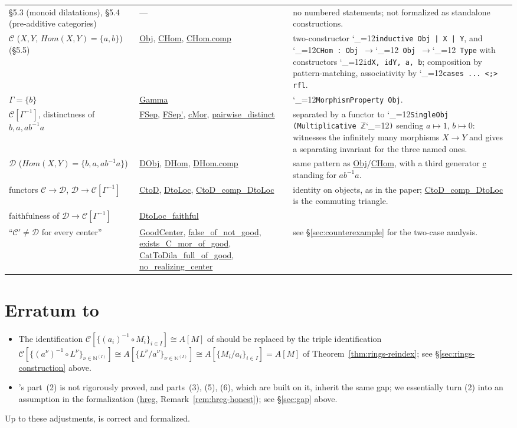 \documentclass[11pt]{amsart}
\newcommand{\lc}[1]{\url{#1}}
\newcommand{\lcode}{\begingroup\catcode`\_=12\relax\lcodeInner}
\newcommand{\lcodeInner}[1]{\texttt{#1}\endgroup}
\theoremstyle{plain}
\theoremstyle{definition}
\theoremstyle{remark}
\newcommand{\calC}{\mathcal C}
\newcommand{\calD}{\mathcal D}
\begin{document}
\begin{longtable}{@{}p{2.55cm}p{4.1cm}p{4.75cm}@{}}
\S5.3 (monoid dilatations), \S5.4 (pre-additive categories) & --- & no numbered statements; not formalized as standalone constructions. \\
$\calC$ ($X,Y$, $Hom(X,Y)=\{a,b\}$) (\S5.5) & \lc{Obj}, \lc{CHom}, \lc{CHom.comp} & two-constructor \lcode{inductive Obj | X | Y}, and \lcode{CHom : Obj }\ensuremath{\to}\lcode{ Obj }\ensuremath{\to}\lcode{ Type} with constructors \lcode{idX, idY, a, b}; composition by pattern-matching, associativity by \lcode{cases ... <;> rfl}. \\
$\Gamma=\{b\}$ & \lc{Gamma} & \lcode{MorphismProperty Obj}. \\
$\calC[\Gamma^{-1}]$, distinctness of $b,a,ab^{-1}a$ & \lc{FSep}, \lc{FSep'}, \lc{cMor}, \lc{pairwise_distinct} & separated by a functor to \lcode{SingleObj (Multiplicative }\ensuremath{\mathbb{Z}}\lcode{)} sending $a\mapsto1$, $b\mapsto0$: witnesses the infinitely many morphisms $X\to Y$ and gives a separating invariant for the three named ones. \\
$\calD$ ($Hom(X,Y)=\{b,a,ab^{-1}a\}$) & \lc{DObj}, \lc{DHom}, \lc{DHom.comp} & same pattern as \lc{Obj}/\lc{CHom}, with a third generator \lc{c} standing for $ab^{-1}a$. \\
functors $\calC\to\calD$, $\calD\to\calC[\Gamma^{-1}]$ & \lc{CtoD}, \lc{DtoLoc}, \lc{CtoD_comp_DtoLoc} & identity on objects, as in the paper; \lc{CtoD_comp_DtoLoc} is the commuting triangle. \\
faithfulness of $\calD\to\calC[\Gamma^{-1}]$ & \lc{DtoLoc_faithful} & \\
``$\calC' \ne \calD$ for every center'' & \lc{GoodCenter}, \lc{false_of_not_good}, \lc{exists_C_mor_of_good}, \lc{CatToDila_full_of_good}, \lc{no_realizing_center} & see \S\ref{sec:counterexample} for the two-case analysis. \\
\end{longtable}
\endgroup

\section{Erratum to \citep{Mayeux}}
\label{app:erratum}

\begin{itemize}
\item The identification $\calC[\{(a_i)^{-1}\circ M_i\}_{i\in I}] \cong A[M]$ of
\citep[Proposition~5.1]{Mayeux} should be replaced by the triple identification
$\calC[\{(a^\nu)^{-1}\circ L^\nu\}_{\nu\in\mathbb N^{(I)}}] \cong A[\{L^\nu/a^\nu\}_{\nu\in\mathbb N^{(I)}}]
\cong A[\{M_i/a_i\}_{i\in I}] = A[M]$ of Theorem~\ref{thm:rings-reindex}; see
\S\ref{sec:rings-construction} above.
\item \citep[Proposition~3.15]{Mayeux}'s part~(2) is not rigorously proved, and parts~(3),
(5), (6), which are built on it, inherit the same gap; we essentially turn (2) into an
assumption in the formalization (\lc{hreg}, Remark~\ref{rem:hreg-honest}); see
\S\ref{sec:gap} above.
\end{itemize}
Up to these adjustments, \citep{Mayeux} is correct and formalized.
\end{document}
